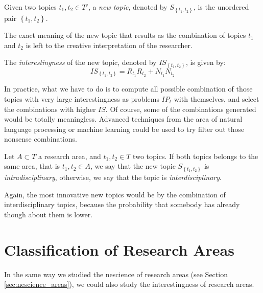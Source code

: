 \begin{definition}
Given two topics $t_{1}, t_{2} \in T'$, a \emph{new topic}, denoted by $S_{\left\{ t_{1},t_{2}\right\}}$, is the unordered pair $\left\{ t_{1},t_{2}\right\}$.
\end{definition}

The exact meaning of the new topic that results as the combination of topics $t_{1}$ and $t_{2}$ is left to the creative interpretation of the researcher.

\begin{definition}
The \emph{interestingness} of the new topic, denoted by $IS_{\left\{ t_{1},t_{2}\right\} }$, is given by:
\[
IS_{\left\{ t_{1},t_{2}\right\} } = R_{t_{1}}R_{t_{2}}+N_{t_{1}}N_{t_{2}}
\]
\end{definition}

In practice, what we have to do is to compute all possible combination of those topics with very large interestingness as problems $IP_{t}$ with themselves, and select the combinations with higher $IS$. Of course, some of the combinations generated would be totally meaningless. Advanced techniques from the area of natural language processing or machine learning could be used to try filter out those nonsense combinations.

\begin{definition} 
Let $A \subset T$ a research area, and $t_{1}, t_{2} \in T$ two topics. If both topics belongs to the same area, that is $t_{1}, t_{2} \in A$, we say that the new topic $S_{\left\{ t_{1},t_{2}\right\} }$ is \emph{intradisciplinary}, otherwise, we say that the topic is \emph{interdisciplinary}.
\end{definition}

Again, the most innovative new topics would be by the combination of interdisciplinary topics, because the probability that somebody has already though about them is lower.

%
%

\section{Classification of Research Areas}

In the same way we studied the nescience of research areas (see Section \ref{sec:nescience_areas}), we could also study the interestingness of research areas.


